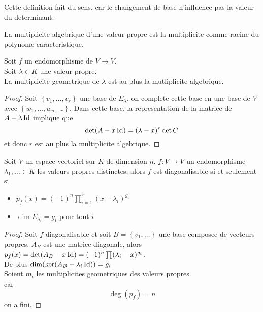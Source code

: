 \documentclass[../main.tex]{subfiles}
\begin{document}
Cette definition fait du sens, car le changement de base n'influence pas la valeur du determinant.
\begin{defn}
	La multiplicite algebrique d'une valeur propre est la multiplicite comme racine du polynome caracteristique.
\end{defn}
\begin{propo}
Soit $f$ un endomorphisme de $V \to V$.\\
Soit $\lambda \in K$ une valeur propre.\\
La multiplicite geometrique de $\lambda$ est au plus la mutliplicite algebrique.
\end{propo}
\begin{proof}
Soit $ \left\{ v_1, \ldots, v_r \right\} $ une base de $E_\lambda$, on complete cette base en une base de $V$ avec $ \left\{ w_1, \ldots, w_{n-r}   \right\} $.
Dans cette base, la representation de la matrice de $A- \lambda \operatorname*{Id}$ implique que
\[ 
	\det (  A- x \operatorname*{Id}) = ( \lambda -x) ^{r} \det C
\]
et donc $r$ est au plus la multiplicite algebrique.

\end{proof}
\begin{thm}
	Soit $V$ un espace vectoriel sur $K$ de dimension $n$, $f:V \to V$ un endomorphisme  $\lambda_1, \ldots \in K$ les valeurs propres distinctes, alors $f$ est diagonalisable si et seulement si
	\begin{itemize}
		\item $p_f( x)= ( -1) ^{n}\prod_{i=1}^{r}( x-\lambda_i)^{g_i}$ 
		\item $\dim E_{\lambda_i}= g_i$ pour tout $i$
	\end{itemize}
	
	
\end{thm}
\begin{proof}
	Soit $f$ diagonalisable et soit $B= \left\{ v_1, \ldots \right\} $ une base composee de vecteurs propres. $A_B$ est une matrice diagonale, alors $p_f( x) = \det( A_B- x \operatorname*{Id}) = ( -1)^{n} \prod ( \lambda_i -x)^{g_i} $.\\
	De plus $\dim( \ker( A_B- \lambda_i \operatorname*{Id}) ) = g_i$\\

	Soient $m_i$ les multiplicites geometriques des valeurs propres.\\
	car 
	\[ 
		\deg ( p_f ) =n
	\]
	on a fini.
\end{proof}
\end{document}
